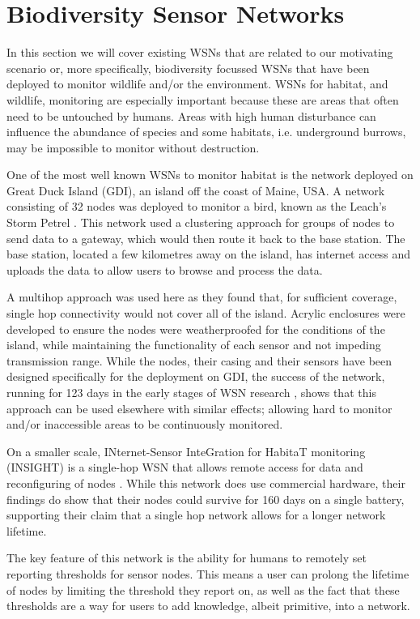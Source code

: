 \section{Biodiversity Sensor Networks} \label{bg:bsn}
	In this section we will cover existing WSNs that are related to our motivating scenario or, more specifically, biodiversity focussed WSNs that have been deployed to monitor wildlife and/or the environment. WSNs for habitat, and wildlife, monitoring are especially important because these are areas that often need to be untouched by humans. Areas with high human disturbance can influence the abundance of species and some habitats, i.e. underground burrows, may be impossible to monitor without destruction.

	One of the most well known WSNs to monitor habitat is the network deployed on Great Duck Island (GDI), an island off the coast of Maine, USA. A network consisting of 32 nodes was deployed to monitor a bird, known as the Leach’s Storm Petrel \cite{Mainwaring2002}. This network used a clustering approach for groups of nodes to send data to a gateway, which would then route it back to the base station. The base station, located a few kilometres away on the island, has internet access and uploads the data to allow users to browse and process the data.

	A multihop approach was used here as they found that, for sufficient coverage, single hop connectivity would not cover all of the island. Acrylic enclosures were developed to ensure the nodes were weatherproofed for the conditions of the island, while maintaining the functionality of each sensor and not impeding transmission range. While the nodes, their casing and their sensors have been designed specifically for the deployment on GDI, the success of the network, running for 123 days in the early stages of WSN research \cite{Szewczyk2004c}, shows that this approach can be used elsewhere with similar effects; allowing hard to monitor and/or inaccessible areas to be continuously monitored.

	On a smaller scale, INternet-Sensor InteGration for HabitaT monitoring (INSIGHT) is a single-hop WSN that allows remote access for data and reconfiguring of nodes \cite{Demirbas}. While this network does use commercial hardware, their findings do show that their nodes could survive for 160 days on a single battery, supporting their claim that a single hop network allows for a longer network lifetime. 
	
	The key feature of this network is the ability for humans to remotely set reporting thresholds for sensor nodes. This means a user can prolong the lifetime of nodes by limiting the threshold they report on, as well as the fact that these thresholds are a way for users to add knowledge, albeit primitive, into a network.

